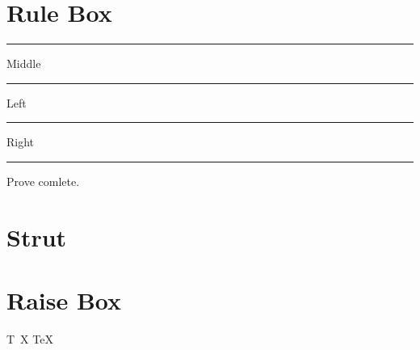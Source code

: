\documentclass{article}
\begin{document}
    \section{Rule Box}
        \rule{1pt}{1em}Middle\rule{1pt}{1em}\par
        Left\rule[0.5ex]{2cm}{0.6pt}Right\par
        \rule[-0.1em]{1em}{1em}Prove comlete. 

    \section{Strut}
        \fbox{---}\par
        \fbox{\strut---}\par
        \fbox{\rule{0pt}{2em}---}

    \section{Raise Box}
        \mbox{T\hspace{-0.1667em}
            \raisebox{-0.5ex}{E}
            \hspace{-0.125em}X}\quad
        \TeX{}
        
\end{document}
